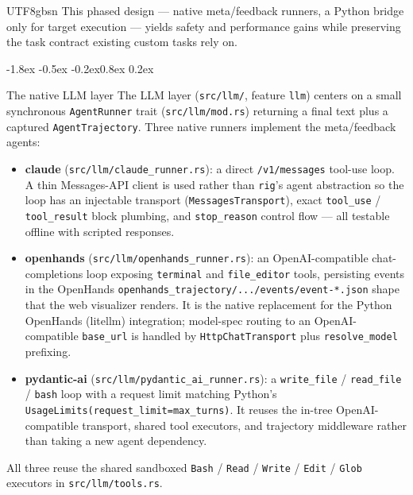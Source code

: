 \documentclass{article}
\makeatletter
\renewcommand{\subsection}{\@startsection{subsection}{2}{\z@}%
  {-1.8ex \@plus -0.5ex \@minus -0.2ex}{0.8ex \@plus 0.2ex}%
  {\normalsize\bfseries\raggedright\color{accent}}}
\makeatother
\begin{document}
\begin{CJK}{UTF8}{gbsn}
This phased design --- native meta/feedback runners, a Python bridge only for target
execution --- yields safety and performance gains while preserving the task contract
existing custom tasks rely on.

\subsection{The native LLM layer}
The LLM layer (\texttt{src/llm/}, feature \texttt{llm}) centers on a small
synchronous \texttt{AgentRunner} trait (\texttt{src/llm/mod.rs}) returning a final
text plus a captured \texttt{AgentTrajectory}. Three native runners implement the
meta/feedback agents:

\begin{itemize}
\item \textbf{claude} (\texttt{src/llm/claude\_runner.rs}): a direct
  \texttt{/v1/messages} tool-use loop. A thin Messages-API client is used rather than
  \texttt{rig}'s agent abstraction so the loop has an injectable transport
  (\texttt{MessagesTransport}), exact \texttt{tool\_use} / \texttt{tool\_result}
  block plumbing, and \texttt{stop\_reason} control flow --- all testable offline
  with scripted responses.
\item \textbf{openhands} (\texttt{src/llm/openhands\_runner.rs}): an
  OpenAI-compatible chat-completions loop exposing \texttt{terminal} and
  \texttt{file\_editor} tools, persisting events in the OpenHands
  \texttt{openhands\_trajectory/.../events/event-*.json} shape that the web
  visualizer renders. It is the native replacement for the Python OpenHands (litellm)
  integration; model-spec routing to an OpenAI-compatible \texttt{base\_url} is
  handled by \texttt{HttpChatTransport} plus \texttt{resolve\_model} prefixing.
\item \textbf{pydantic-ai} (\texttt{src/llm/pydantic\_ai\_runner.rs}): a
  \texttt{write\_file} / \texttt{read\_file} / \texttt{bash} loop with a request limit
  matching Python's \texttt{UsageLimits(request\_limit=max\_turns)}. It reuses the
  in-tree OpenAI-compatible transport, shared tool executors, and trajectory
  middleware rather than taking a new agent dependency.
\end{itemize}

All three reuse the shared sandboxed \texttt{Bash} / \texttt{Read} / \texttt{Write} /
\texttt{Edit} / \texttt{Glob} executors in \texttt{src/llm/tools.rs}.


\end{CJK}
\end{document}

